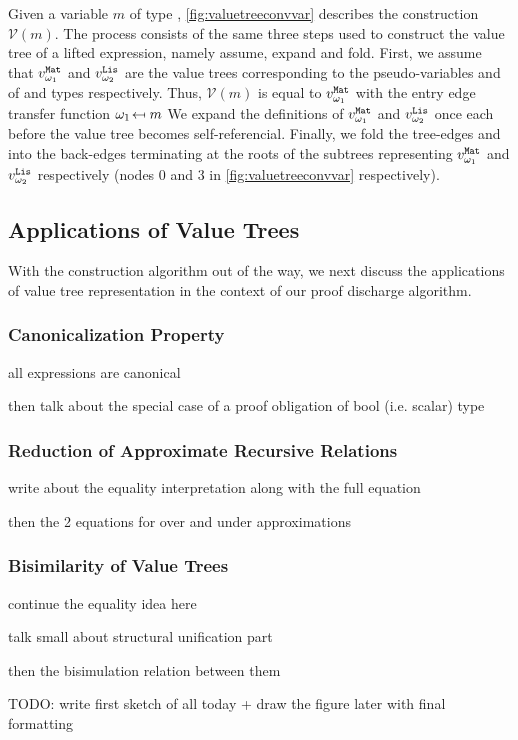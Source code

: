 Given a variable $m$ of type , \cref{fig:valuetreeconvvar} describes the
construction $\mathcal{V}(m)$.
The process consists of the same three steps used to construct the value tree
of a lifted expression, namely assume, expand and fold.
First, we assume that $v_{\omega_{1}\!}^{\tt Mat}$ and $v_{\omega_{2}\!}^{\tt Lis}$ are the value trees
corresponding to the pseudo-variables  and  of  and 
types respectively.
Thus, $\mathcal{V}(m)$ is equal to $v_{\omega_{1}\!}^{\tt Mat}$ with the entry edge transfer function
${{\omega_{1}\!} \mapsfrom m}$
We expand the definitions of $v_{\omega_{1}\!}^{\tt Mat}$ and $v_{\omega_{2}\!}^{\tt Lis}$ once each before
the value tree becomes self-referencial.
Finally, we fold the tree-edges  and  into the back-edges
terminating at the roots of the subtrees representing $v_{\omega_{1}\!}^{\tt Mat}$ and $v_{\omega_{2}\!}^{\tt Lis}$
respectively (nodes 0 and 3 in \cref{fig:valuetreeconvvar} respectively).

\subsection{Applications of Value Trees}
\label{sec:valuetreeapps}
With the construction algorithm out of the way, we next discuss the applications of value tree representation
in the context of our proof discharge algorithm.

\subsubsection{Canonicalization Property}

all expressions are canonical

then talk about the special case of a proof obligation of bool (i.e. scalar) type

\subsubsection{Reduction of Approximate Recursive Relations}

write about the equality interpretation along with the full equation

then the 2 equations for over and under approximations

\subsubsection{Bisimilarity of Value Trees}

continue the equality idea here

talk small about structural unification part

then the bisimulation relation between them

TODO: write first sketch of all today + draw the figure later with final formatting